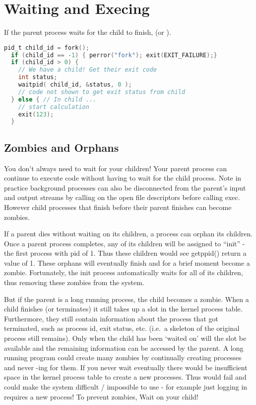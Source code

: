 \section{Waiting and Execing}

If the parent process waits for the child to finish,  (or ).

\begin{lstlisting}[language=C]
  pid_t child_id = fork();
  if (child_id == -1) { perror("fork"); exit(EXIT_FAILURE);}
  if (child_id > 0) { 
    // We have a child! Get their exit code
    int status; 
    waitpid( child_id, &status, 0 );
    // code not shown to get exit status from child
  } else { // In child ...
    // start calculation
    exit(123);
  }
\end{lstlisting}

\subsection{Zombies and Orphans}

You don't always need to wait for your children! Your parent process can continue to execute code without having to wait for the child process. Note in practice background processes can also be disconnected from the parent's input and output streams by calling  on the open file descriptors before calling exec. However child processes that finish before their parent finishes can become zombies.

If a parent dies without waiting on its children, a process can orphan its children. Once a parent process completes, any of its children will be assigned to ``init'' - the first process with pid of 1. Thus these children would see getppid() return a value of 1. These orphans will eventually finish and for a brief moment become a zombie. Fortunately, the init process automatically waits for all of its children, thus removing these zombies from the system.

But if the parent is a long running process, the child becomes a zombie. When a child finishes (or terminates) it still takes up a slot in the kernel process table. Furthermore, they still contain information about the process that got terminated, such as process id, exit status, etc. (i.e.~a skeleton of the original process still remains). Only when the child has been `waited on' will the slot be available and the remaining information can be accessed by the parent. A long running program could create many zombies by continually creating processes and never -ing for them. If you never wait eventually there would be insufficient space in the kernel process table to create a new processes. Thus  would fail and could make the system difficult / impossible to use - for example just logging in requires a new process! To prevent zombies, Wait on your child!

